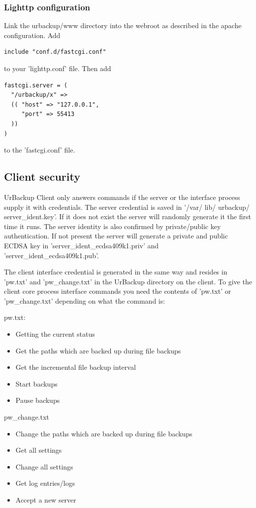 \documentclass[a4paper,10pt]{article}
\begin{document}
\subsubsection{Lighttp configuration}

Link the urbackup/www directory into the webroot as described in the apache configuration.
Add
\begin{verbatim}
include "conf.d/fastcgi.conf"
\end{verbatim}
to your 'lighttp.conf' file. Then add 
\begin{verbatim}
fastcgi.server = (
  "/urbackup/x" =>
  (( "host" => "127.0.0.1",
     "port" => 55413
  ))
)
\end{verbatim}
to the 'fastcgi.conf' file.

\subsection{Client security}

UrBackup Client only answers commands if the server or the interface process supply it with credentials. The server credential is saved in '/var/ lib/ urbackup/ server\_ident.key'. If it does not exist the server will randomly generate it the first time it runs. The server identity is also confirmed by private/public key authentication. If not present the server will generate a private and public ECDSA key in 'server\_ident\_ecdsa409k1.priv' and 'server\_ident\_ecdsa409k1.pub'. 

The client interface credential is generated in the same way and resides in 'pw.txt' and 'pw\_change.txt' in the UrBackup directory on the client. To give the client core process interface commands you need the contents of 'pw.txt' or 'pw\_change.txt' depending on what the command is:

pw.txt:
\begin{itemize}
  \item Getting the current status
  \item Get the paths which are backed up during file backups
  \item Get the incremental file backup interval
  \item Start backups
  \item Pause backups   
\end{itemize}

pw\_change.txt
\begin{itemize}
  \item Change the paths which are backed up during file backups
  \item Get all settings
  \item Change all settings
  \item Get log entries/logs
  \item Accept a new server
\end{itemize}
\end{document}
